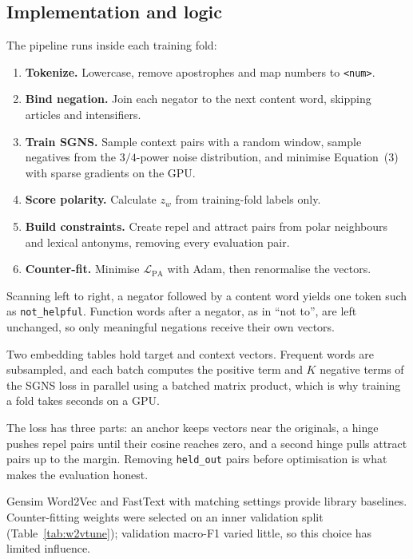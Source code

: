 \documentclass[11pt,a4paper]{article}
\newcommand{\T}[1]{}
\newcommand{\codefile}[3]{\par\vspace{0pt plus 3.5cm}\penalty-100\vspace{0pt plus -3.5cm}}
\begin{document}
\subsection{Implementation and logic}
The pipeline runs inside each training fold:
\begin{enumerate}
\item \textbf{Tokenize.} Lowercase, remove apostrophes and map numbers to \texttt{<num>}.
\item \textbf{Bind negation.} Join each negator to the next content word, skipping articles and intensifiers.
\item \textbf{Train SGNS.} Sample context pairs with a random window, sample negatives from the $3/4$-power noise distribution, and minimise Equation~(3) with sparse gradients on the GPU.
\item \textbf{Score polarity.} Calculate $z_w$ from training-fold labels only.
\item \textbf{Build constraints.} Create repel and attract pairs from polar neighbours and lexical antonyms, removing every evaluation pair.
\item \textbf{Counter-fit.} Minimise $\mathcal{L}_{\mathrm{PA}}$ with Adam, then renormalise the vectors.
\end{enumerate}
\codefile{bind_negation}{Negation binding}{text.py}
Scanning left to right, a negator followed by a content word yields one token such as \texttt{not\_helpful}. Function words after a negator, as in ``not to'', are left unchanged, so only meaningful negations receive their own vectors.
\codefile{train_sgns}{Skip-gram with negative sampling, written from scratch}{embeddings.py}
Two embedding tables hold target and context vectors. Frequent words are subsampled, and each batch computes the positive term and $K$ negative terms of the SGNS loss in parallel using a batched matrix product, which is why training a fold takes seconds on a GPU.
\codefile{log_odds}{Polarity score from training labels}{embeddings.py}
\codefile{counterfit}{Polarity counter-fitting}{embeddings.py}
The loss has three parts: an anchor keeps vectors near the originals, a hinge pushes repel pairs until their cosine reaches zero, and a second hinge pulls attract pairs up to the margin. Removing \texttt{held\_out} pairs before optimisation is what makes the evaluation honest.

Gensim Word2Vec and FastText with matching settings provide library baselines. Counter-fitting weights were selected on an inner validation split (Table~\ref{tab:w2vtune}); validation macro-F1 varied little, so this choice has limited influence.
\T{w2v_tuning}
\end{document}
